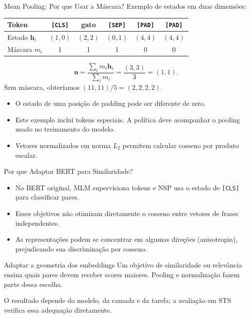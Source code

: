 \documentclass[aspectratio=169, xcolor=dvipsnames]{beamer}
\begin{document}
  \begin{frame}{Mean Pooling: Por que Usar a Máscara?}
    Exemplo de estados em duas dimensões:
    \begin{center}
      \begin{tabular}{lccccc}
        \toprule
        Token & \texttt{[CLS]} & gato & \texttt{[SEP]} & \texttt{[PAD]} & \texttt{[PAD]}\\
        \midrule
        Estado $\mathbf h_i$ & $(1,0)$ & $(2,2)$ & $(0,1)$ & $(4,4)$ & $(4,4)$\\
        Máscara $m_i$ & 1 & 1 & 1 & 0 & 0\\
        \bottomrule
      \end{tabular}
    \end{center}
    \[
      \mathbf u=\frac{\sum_i m_i\mathbf h_i}{\sum_i m_i}
        =\frac{(3,3)}{3}=(1,1).
    \]
    Sem máscara, obteríamos $(11,11)/5=(2{,}2,2{,}2)$.
    \begin{itemize}
      \item O estado de uma posição de padding pode ser diferente de zero.
      \item Este exemplo inclui tokens especiais. A política deve acompanhar
      o pooling usado no treinamento do modelo.
      \item Vetores normalizados em norma $L_2$ permitem calcular cosseno por produto escalar.
    \end{itemize}
  \end{frame}

  \begin{frame}{Por que Adaptar BERT para Similaridade?}
    \begin{itemize}
      \item No BERT original, MLM supervisiona tokens e NSP usa o estado de \texttt{[CLS]} para classificar pares.
      \item Esses objetivos não otimizam diretamente o cosseno entre vetores de frases independentes.
      \item As representações podem se concentrar em algumas direções (anisotropia), prejudicando sua discriminação por cosseno.
    \end{itemize}
    \begin{block}{Adaptar a geometria dos embeddings}
      Um objetivo de similaridade ou relevância ensina quais pares devem
      receber scores maiores. Pooling e normalização fazem parte dessa escolha.
    \end{block}
    O resultado depende do modelo, da camada e da tarefa; a avaliação
    em STS verifica essa adequação diretamente.
  \end{frame}
\end{document}

